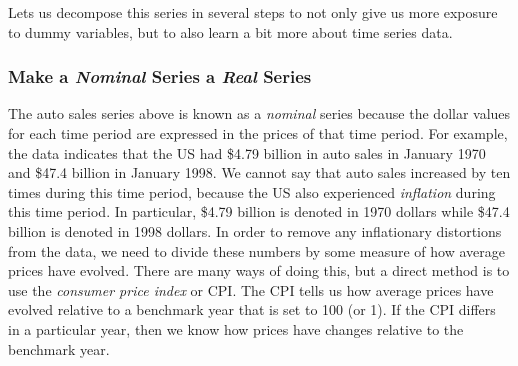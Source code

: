 \documentclass[
]{book}
\begin{document}
Lets us decompose this series in several steps to not only give us more exposure to dummy variables, but to also learn a bit more about time series data.

\hypertarget{make-a-nominal-series-a-real-series}{%
\subsubsection*{\texorpdfstring{Make a \emph{Nominal} Series a \emph{Real} Series}{Make a Nominal Series a Real Series}}\label{make-a-nominal-series-a-real-series}}

The auto sales series above is known as a \emph{nominal} series because the dollar values for each time period are expressed in the prices of that time period. For example, the data indicates that the US had \$4.79 billion in auto sales in January 1970 and \$47.4 billion in January 1998. We cannot say that auto sales increased by ten times during this time period, because the US also experienced \emph{inflation} during this time period. In particular, \$4.79 billion is denoted in 1970 dollars while \$47.4 billion is denoted in 1998 dollars. In order to remove any inflationary distortions from the data, we need to divide these numbers by some measure of how average prices have evolved. There are many ways of doing this, but a direct method is to use the \emph{consumer price index} or CPI. The CPI tells us how average prices have evolved relative to a benchmark year that is set to 100 (or 1). If the CPI differs in a particular year, then we know how prices have changes relative to the benchmark year.
\end{document}
